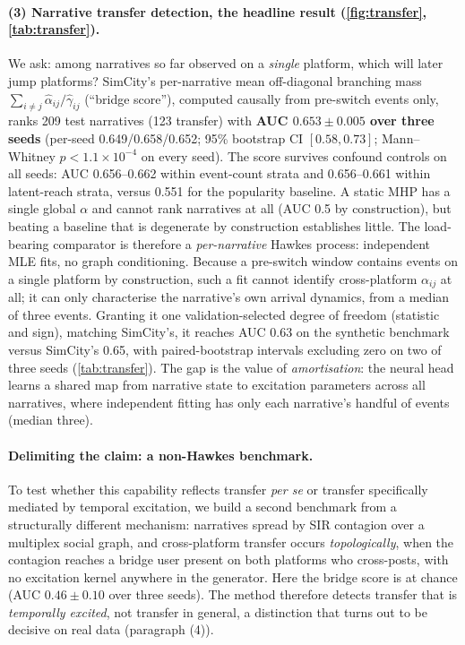 \documentclass[11pt]{article}
\begin{document}
\paragraph{(3) Narrative transfer detection, the headline result
(\cref{fig:transfer}, \cref{tab:transfer}).} We ask:
among narratives so far observed on a \emph{single} platform, which will later
jump platforms? SimCity's per-narrative mean off-diagonal branching mass
$\sum_{i \ne j} \hat\alpha_{ij}/\hat\gamma_{ij}$ (``bridge score''), computed
causally from pre-switch events only, ranks 209 test narratives (123 transfer)
with \textbf{AUC $0.653 \pm 0.005$ over three seeds} (per-seed 0.649/0.658/0.652;
95\% bootstrap CI $[0.58, 0.73]$; Mann--Whitney $p < 1.1\times10^{-4}$ on every
seed). The score survives confound controls on all seeds: AUC 0.656--0.662
within event-count strata and 0.656--0.661 within latent-reach strata, versus
0.551 for the popularity baseline. A static MHP has a single global $\alpha$ and cannot rank narratives at all
(AUC 0.5 by construction), but beating a baseline that is degenerate by
construction establishes little. The load-bearing comparator is therefore a
\emph{per-narrative} Hawkes process: independent MLE fits, no graph
conditioning. Because a pre-switch window contains events on a single platform
by construction, such a fit cannot identify cross-platform $\alpha_{ij}$ at
all; it can only characterise the narrative's own arrival dynamics, from a
median of three events. Granting it one validation-selected degree of freedom
(statistic and sign), matching SimCity's, it reaches AUC 0.63 on the synthetic
benchmark versus SimCity's 0.65, with paired-bootstrap intervals excluding zero
on two of three seeds (\cref{tab:transfer}). The gap is the value of
\emph{amortisation}: the neural head learns a shared map from narrative state
to excitation parameters across all narratives, where independent fitting has
only each narrative's handful of events (median three).

\paragraph{Delimiting the claim: a non-Hawkes benchmark.} To test whether this
capability reflects transfer \emph{per se} or transfer specifically mediated by
temporal excitation, we build a second benchmark from a structurally different
mechanism: narratives spread by SIR contagion over a multiplex social graph,
and cross-platform transfer occurs \emph{topologically}, when the contagion
reaches a bridge user present on both platforms who cross-posts, with no
excitation kernel anywhere in the generator. Here the bridge score is at chance
(AUC $0.46 \pm 0.10$ over three seeds). The method therefore detects transfer
that is \emph{temporally excited}, not transfer in general, a distinction
that turns out to be decisive on real data (paragraph (4)).
\end{document}
